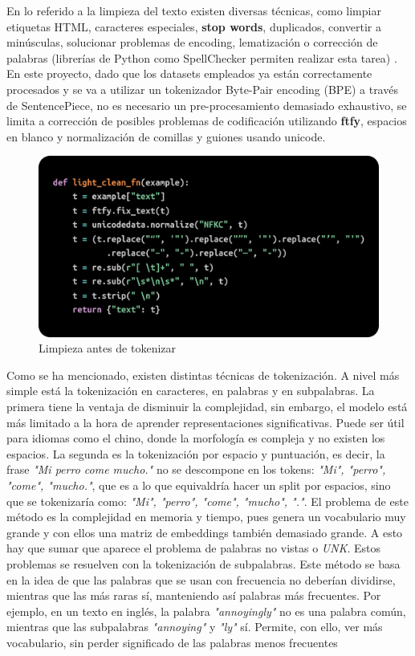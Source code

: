 \documentclass[11pt]{book}
\theoremstyle{plain}
\theoremstyle{definition}
\begin{document}
En lo referido a la limpieza del texto existen diversas técnicas, como limpiar etiquetas HTML, caracteres especiales, \textbf{stop words}, duplicados, convertir a minúsculas, solucionar problemas de encoding, lematización o corrección de palabras (librerías de Python como SpellChecker permiten realizar esta tarea) \parencite{shabbir2021cleaning}. En este proyecto, dado que los datasets empleados ya están correctamente procesados y se va a utilizar un tokenizador Byte-Pair encoding (BPE) a través de SentencePiece, no es necesario un pre-procesamiento demasiado exhaustivo, se limita a corrección de posibles problemas de codificación utilizando \textbf{ftfy}, espacios en blanco y normalización de comillas y guiones usando unicode.

\begin{figure}[h]
    \centering
    \includegraphics[width=0.5\linewidth]{img/preclean.png}
    \caption{Limpieza antes de tokenizar}
    \label{fig:placeholder2}
\end{figure}
Como se ha mencionado, existen distintas técnicas de tokenización. A nivel más simple está la tokenización en caracteres, en palabras y en subpalabras. La primera tiene la ventaja de disminuir la complejidad, sin embargo, el modelo está más limitado a la hora de aprender representaciones significativas. Puede ser útil para idiomas como el chino, donde la morfología es compleja y no existen los espacios. La segunda es la tokenización por espacio y puntuación, es decir, la frase \textit{"Mi perro come mucho."} no se descompone en los tokens: \textit{"Mi", "perro", "come", "mucho."}, que es a lo que equivaldría hacer un split por espacios, sino que se tokenizaría como: \textit{"Mi", "perro", "come", "mucho", "."}. El problema de este método es la complejidad en memoria y tiempo, pues genera un vocabulario muy grande y con ellos una matriz de embeddings también demasiado grande. A esto hay que sumar que aparece el problema de palabras no vistas o \textit{UNK}. 
Estos problemas se resuelven con la tokenización de subpalabras. Este método se basa en la idea de que las palabras que se usan con frecuencia no deberían dividirse, mientras que las más raras sí, manteniendo así palabras más frecuentes. Por ejemplo, en un texto en inglés, la palabra \textit{"annoyingly"} no es una palabra común, mientras que las subpalabras \textit{"annoying"} y \textit{"ly"} sí. Permite, con ello, ver más vocabulario, sin perder significado de las palabras menos frecuentes \parencite{lmpo2020bpe}
\end{document}
